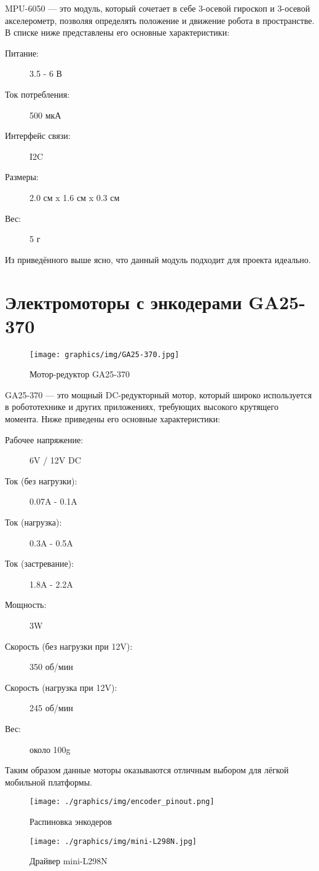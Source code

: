 MPU-6050 --- это модуль, который сочетает в себе 3-осевой гироскоп и 3-осевой акселерометр, позволяя определять положение и движение робота в пространстве. В списке ниже представлены его основные характеристики:

\begin{description}
    \item[Питание:] 3.5 - 6 В
    \item[Ток потребления:] 500 мкА
    \item[Интерфейс связи:] I2C
    \item[Размеры:] 2.0 см x 1.6 см x 0.3 см
    \item[Вес:] 5 г
\end{description}

Из приведённого выше ясно, что данный модуль подходит для проекта идеально.

\section{Электромоторы с энкодерами GA25-370}
\begin{figure}[!t]
	\texttt{[image: graphics/img/GA25-370.jpg]}
	\caption{Мотор-редуктор GA25-370}
	\label{f:GA25_370}
\end{figure}

GA25-370 --- это мощный DC-редукторный мотор, который широко используется в робототехнике и других приложениях, требующих высокого крутящего момента. Ниже приведены его основные характеристики:

\begin{description}
    \item[Рабочее напряжение:] 6V / 12V DC
    \item[Ток (без нагрузки):] 0.07A - 0.1A
    \item[Ток (нагрузка):] 0.3A - 0.5A
    \item[Ток (застревание):] 1.8A - 2.2A
    \item[Мощность:] 3W
    \item[Скорость (без нагрузки при 12V):] 350 об/мин
    \item[Скорость (нагрузка при 12V):] 245 об/мин
    \item[Вес:] около 100g
\end{description}

Таким образом данные моторы оказываются отличным выбором для лёгкой мобильной платформы.

\begin{figure}[!h]
    \texttt{[image: ./graphics/img/encoder\_pinout.png]}
    \caption{Распиновка энкодеров}
    \label{f:enc_pinout}
\end{figure}
\begin{figure}[!h]
    \texttt{[image: ./graphics/img/mini-L298N.jpg]}
    \caption{Драйвер mini-L298N}
    \label{f:L298N}
\end{figure}

